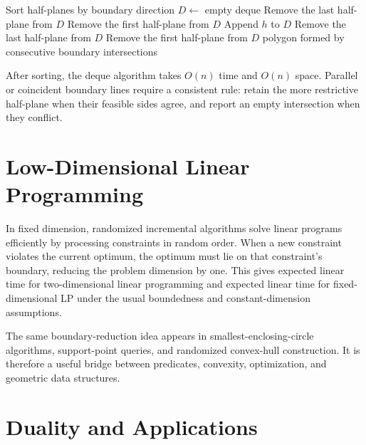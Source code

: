 \begin{algorithm}[htbp]
\caption{Half-Plane Intersection}
\label{alg:halfplane_intersection}
\begin{algorithmic}[1]
  \State Sort half-planes by boundary direction
  \State $D\gets$ empty deque
      \State Remove the last half-plane from $D$
    \EndWhile
      \State Remove the first half-plane from $D$
    \EndWhile
    \State Append $h$ to $D$
  \EndFor
    \State Remove the last half-plane from $D$
  \EndWhile
    \State Remove the first half-plane from $D$
  \EndWhile
  \State \Return polygon formed by consecutive boundary intersections
\EndFunction
\end{algorithmic}
\end{algorithm}

After sorting, the deque algorithm takes $O(n)$ time and $O(n)$ space. Parallel
or coincident boundary lines require a consistent rule: retain the more
restrictive half-plane when their feasible sides agree, and report an empty
intersection when they conflict.

\section{Low-Dimensional Linear Programming}
\label{sec:low_dimensional_lp}

In fixed dimension, randomized incremental algorithms solve linear programs
efficiently by processing constraints in random order. When a new constraint
violates the current optimum, the optimum must lie on that constraint's
boundary, reducing the problem dimension by one. This gives expected linear
time for two-dimensional linear programming and expected linear time for
fixed-dimensional LP under the usual boundedness and constant-dimension
assumptions.

The same boundary-reduction idea appears in smallest-enclosing-circle
algorithms, support-point queries, and randomized convex-hull construction.
It is therefore a useful bridge between predicates, convexity, optimization,
and geometric data structures.

\section{Duality and Applications}
\label{sec:lp_duality_applications}

